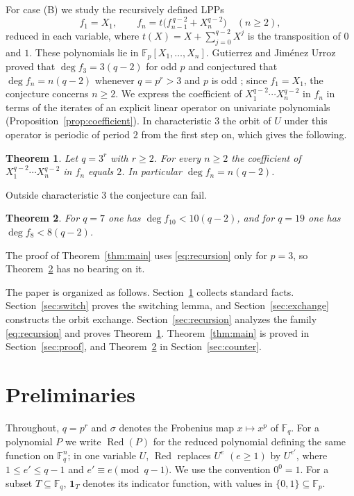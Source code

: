 \documentclass[11pt]{amsart}
\newtheorem{theorem}{Theorem}[section]
\theoremstyle{definition}
\theoremstyle{remark}
\newcommand{\F}{\mathbb{F}}
\newcommand{\Red}{\operatorname{Red}}
\newcommand{\one}{\mathbf{1}}
\begin{document}
For case (B) we study the recursively defined LPPs
\begin{equation}\label{eq:recursion}
f_1=X_1,\qquad f_n=t\bigl(f_{n-1}^{\,q-2}+X_n^{q-2}\bigr)\quad(n\ge2),
\end{equation}
reduced in each variable, where $t(X)=X+\sum_{j=0}^{q-2}X^j$ is the transposition of $0$ and $1$. These polynomials lie in $\F_p[X_1,\dots,X_n]$. Gutierrez and Jim\'enez Urroz proved that $\deg f_3=3(q-2)$ for odd $p$ and conjectured that $\deg f_n=n(q-2)$ whenever $q=p^r>3$ and $p$ is odd \cite[Theorem~8 and Conjecture~1]{GU25a}; since $f_1=X_1$, the conjecture concerns $n\ge2$. We express the coefficient of $X_1^{q-2}\cdots X_n^{q-2}$ in $f_n$ in terms of the iterates of an explicit linear operator on univariate polynomials (Proposition~\ref{prop:coefficient}). In characteristic $3$ the orbit of $U$ under this operator is periodic of period $2$ from the first step on, which gives the following.

\begin{theorem}\label{thm:char3}
Let $q=3^r$ with $r\ge2$. For every $n\ge2$ the coefficient of $X_1^{q-2}\cdots X_n^{q-2}$ in $f_n$ equals $2$. In particular $\deg f_n=n(q-2)$.
\end{theorem}

Outside characteristic $3$ the conjecture can fail.

\begin{theorem}\label{thm:counter}
For $q=7$ one has $\deg f_{10}<10(q-2)$, and for $q=19$ one has $\deg f_8<8(q-2)$.
\end{theorem}

The proof of Theorem~\ref{thm:main} uses \eqref{eq:recursion} only for $p=3$, so Theorem~\ref{thm:counter} has no bearing on it.

The paper is organized as follows. Section~\ref{sec:prelim} collects standard facts. Section~\ref{sec:switch} proves the switching lemma, and Section~\ref{sec:exchange} constructs the orbit exchange. Section~\ref{sec:recursion} analyzes the family \eqref{eq:recursion} and proves Theorem~\ref{thm:char3}. Theorem~\ref{thm:main} is proved in Section~\ref{sec:proof}, and Theorem~\ref{thm:counter} in Section~\ref{sec:counter}.

\section{Preliminaries}\label{sec:prelim}

Throughout, $q=p^r$ and $\sigma$ denotes the Frobenius map $x\mapsto x^p$ of $\F_q$. For a polynomial $P$ we write $\Red(P)$ for the reduced polynomial defining the same function on $\F_q^n$; in one variable $U$, $\Red$ replaces $U^e$ $(e\ge1)$ by $U^{e'}$, where $1\le e'\le q-1$ and $e'\equiv e\pmod{q-1}$. We use the convention $0^0=1$. For a subset $T\subseteq\F_q$, $\one_T$ denotes its indicator function, with values in $\{0,1\}\subseteq\F_p$.
\end{document}
